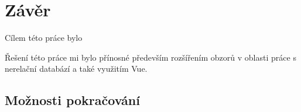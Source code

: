 \chapter{Závěr}
Cílem této práce bylo \blindtext

\blindtext %

Řešení této práce mi bylo přínosné především rozšířením obzorů v oblasti práce s nerelační databází a také využitím Vue.

\section{Možnosti pokračování}
\blindtext
